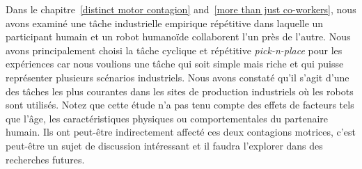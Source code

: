

Dans le chapitre~\ref{distinct motor contagion} and~\ref{more than just co-workers}, nous avons examiné une tâche industrielle empirique répétitive dans laquelle un participant humain et un robot humanoïde collaborent l'un près de l'autre. Nous avons principalement choisi la tâche cyclique et répétitive \textit{pick-n-place} pour les expériences car nous voulions une tâche qui soit simple mais riche et qui puisse représenter plusieurs scénarios industriels. Nous avons constaté qu'il s'agit d'une des tâches les plus courantes dans les sites de production industriels où les robots sont utilisés. Notez que cette étude n'a pas tenu compte des effets de facteurs tels que l'âge, les caractéristiques physiques ou comportementales du partenaire humain. Ils ont peut-être indirectement affecté ces deux contagions motrices, c'est peut-être un sujet de discussion intéressant et il faudra l'explorer dans des recherches futures.






